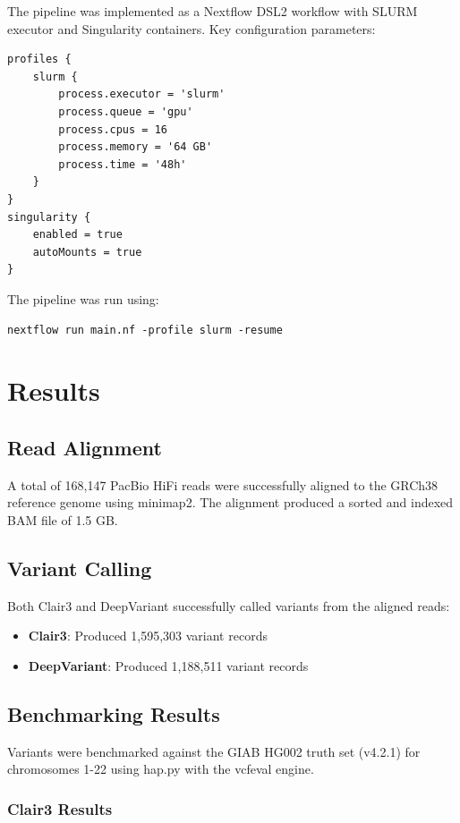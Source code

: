 \documentclass[12pt,a4paper]{article}
\begin{document}
The pipeline was implemented as a Nextflow DSL2 workflow with SLURM executor and Singularity containers. Key configuration parameters:

\begin{lstlisting}
profiles {
    slurm {
        process.executor = 'slurm'
        process.queue = 'gpu'
        process.cpus = 16
        process.memory = '64 GB'
        process.time = '48h'
    }
}
singularity {
    enabled = true
    autoMounts = true
}
\end{lstlisting}

The pipeline was run using:
\begin{lstlisting}
nextflow run main.nf -profile slurm -resume
\end{lstlisting}

\section{Results}

\subsection{Read Alignment}
A total of 168,147 PacBio HiFi reads were successfully aligned to the GRCh38 reference genome using minimap2. The alignment produced a sorted and indexed BAM file of 1.5 GB.

\subsection{Variant Calling}
Both Clair3 and DeepVariant successfully called variants from the aligned reads:
\begin{itemize}
    \item \textbf{Clair3}: Produced 1,595,303 variant records
    \item \textbf{DeepVariant}: Produced 1,188,511 variant records
\end{itemize}

\subsection{Benchmarking Results}

Variants were benchmarked against the GIAB HG002 truth set (v4.2.1) for chromosomes 1-22 using hap.py with the vcfeval engine.

\subsubsection{Clair3 Results}
\end{document}
